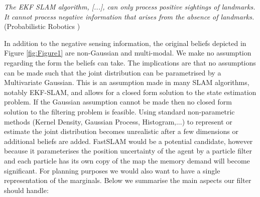 \documentclass[review]{elsarticle}
\numberwithin{equation}{section}
\begin{document}
{\quote \textit{The EKF SLAM algorithm, [...], can only process positive sightings of landmarks. It cannot process negative information
that arises from the absence of landmarks. } (Probabilistic Robotics \cite[p.313]{Thrun_Burgard_Fox_2005})}

In addition to the negative sensing information, the original beliefs depicted in Figure \ref{fig:Figure1} are non-Gaussian
and multi-modal. We make no assumption regarding the form the beliefs can take. The implications are that no assumptions can be
made such that the joint distribution can be parametrised by a Multivariate Gaussian. This is an assumption made in many
SLAM algorithms, notably EKF-SLAM, and allows for a closed form solution to the state estimation problem. If the Gaussian assumption 
cannot be made then no closed form solution to the filtering problem is feasible. 
Using standard non-parametric methods (Kernel Density, Gaussian Process, Histogram,...) to represent or estimate the joint distribution becomes
unrealistic after a few dimensions or additional beliefs are added. 
FastSLAM would be a potential candidate, however because it parameterises the position uncertainty of the agent by a particle filter and each
particle has its own copy of the map the memory demand will become significant.  For planning purposes we would also want to have a 
single representation of the marginals.
Below we summarise the main aspects our filter should handle:\\[0.1cm]

\\[0.1cm]
\end{document}
